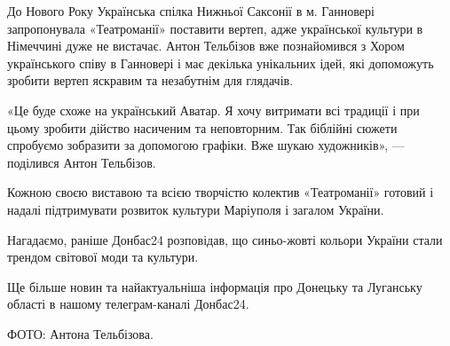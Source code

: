 До Нового Року Українська спілка Нижньої Саксонії в м. Ганновері запропонувала
«Театроманії» поставити вертеп, адже української культури в Німеччині дуже не
вистачає. Антон Тельбізов вже познайомився з Хором українського співу в
Ганновері і має декілька унікальних ідей, які допоможуть зробити вертеп
яскравим та незабутнім для глядачів.

«Це буде схоже на український Аватар. Я хочу витримати всі традиції і при цьому
зробити дійство насиченим та неповторним. Так біблійні сюжети спробуємо
зобразити за допомогою графіки. Вже шукаю художників», — поділився Антон
Тельбізов.

Кожною своєю виставою та всією творчістю колектив «Театроманії» готовий і
надалі підтримувати розвиток культури Маріуполя і загалом України. 

Нагадаємо, раніше Донбас24 розповідав, що синьо-жовті кольори України стали
трендом світової моди та культури.

Ще більше новин та найактуальніша інформація про Донецьку та Луганську області
в нашому телеграм-каналі Донбас24.

ФОТО: Антона Тельбізова.
